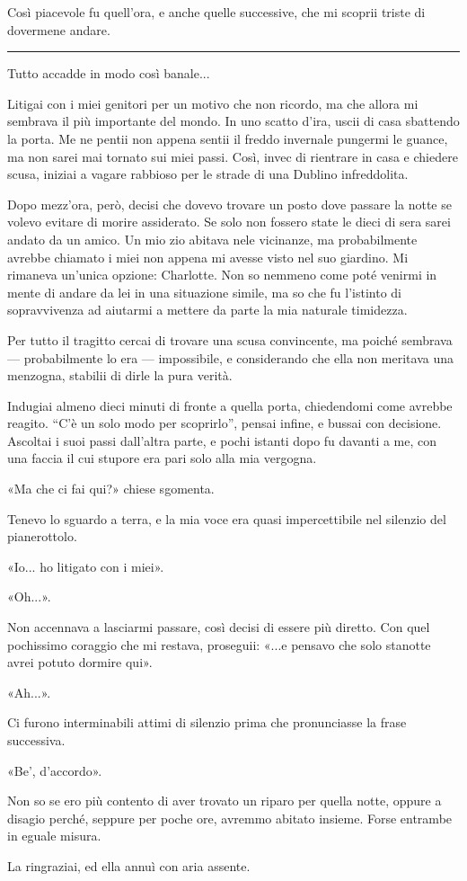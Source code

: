\documentclass[a4paper,11pt,oneside,openright,final]{memoir}
\begin{document}
Così piacevole fu quell'ora, e anche quelle successive, che mi scoprii triste di
dovermene andare.

\plainbreak{1}

Tutto accadde in modo così banale...

Litigai con i miei genitori per un motivo che non ricordo, ma che allora mi
sembrava il più importante del mondo. In uno scatto d'ira, uscii di casa
sbattendo la porta. Me ne pentii non appena sentii il freddo invernale pungermi
le guance, ma non sarei mai tornato sui miei passi. Così, invec di rientrare in
casa e chiedere scusa, iniziai a vagare rabbioso per le strade di una Dublino
infreddolita.

Dopo mezz'ora, però, decisi che dovevo trovare un posto dove passare la notte
se volevo evitare di morire assiderato. Se solo non fossero state le dieci di
sera sarei andato da un amico. Un mio zio abitava nele vicinanze, ma
probabilmente avrebbe chiamato i miei non appena mi avesse visto nel suo
giardino. Mi rimaneva un'unica opzione: Charlotte. Non so nemmeno come poté
venirmi in mente di andare da lei in una situazione simile, ma so che fu
l'istinto di sopravvivenza ad aiutarmi a mettere da parte la mia naturale
timidezza.

Per tutto il tragitto cercai di trovare una scusa convincente, ma poiché
sembrava --- probabilmente lo era --- impossibile, e considerando che ella non
meritava una menzogna, stabilii di dirle la pura verità.

Indugiai almeno dieci minuti di fronte a quella porta, chiedendomi come avrebbe
reagito. ``C'è un solo modo per scoprirlo'', pensai infine, e bussai con
decisione. Ascoltai i suoi passi dall'altra parte, e pochi istanti dopo fu
davanti a me, con una faccia il cui stupore era pari solo alla mia vergogna.

«Ma che ci fai qui?» chiese sgomenta.

Tenevo lo sguardo a terra, e la mia voce era quasi impercettibile nel silenzio
del pianerottolo.

«Io... ho litigato con i miei».

«Oh...».

Non accennava a lasciarmi passare, così decisi di essere più diretto. Con quel
pochissimo coraggio che mi restava, proseguii: «...e pensavo che solo stanotte
avrei potuto dormire qui».

«Ah...».

Ci furono interminabili attimi di silenzio prima che pronunciasse la frase
successiva.

«Be', d'accordo».

Non so se ero più contento di aver trovato un riparo per quella notte, oppure
a disagio perché, seppure per poche ore, avremmo abitato insieme. Forse entrambe
in eguale misura.

La ringraziai, ed ella annuì con aria assente.

\clearpage

\tableofcontents
\end{document}
